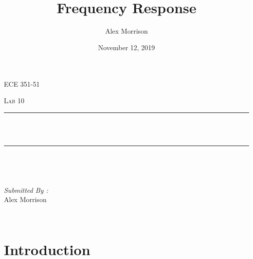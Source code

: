 \documentclass[12pt]{report}
\title{Frequency Response}
\author{ Alex Morrison}
\date{November 12, 2019}
\makeatletter
\let\thetitle\@title
\makeatother
\begin{document}

\begin{titlepage}
	\centering
    \vspace*{0.5 cm}
\begin{center}    \textsc{\Large ECE 351-51}\\[2.0 cm]	\end{center}%
	\textsc{\Large  Lab 10}\\[0.5 cm]				%
	\rule{\linewidth}{0.2 mm} \\[0.4 cm]
	{ \huge \bfseries \thetitle}\\
	\rule{\linewidth}{0.2 mm} \\[1.5 cm]
	
	\begin{minipage}{0.4\textwidth}
		\begin{flushleft} \large
			\end{flushleft}
			\end{minipage}~
			\begin{minipage}{0.4\textwidth}
            
			\begin{flushright} \large
			\emph{Submitted By :} \\
			Alex Morrison  
		\end{flushright}
           
	\end{minipage}\\[2 cm]
	

    
    
    
    
	
\end{titlepage}


\tableofcontents
\pagebreak

\renewcommand{\thesection}{\arabic{section}}
\section{Introduction}
\end{document}
